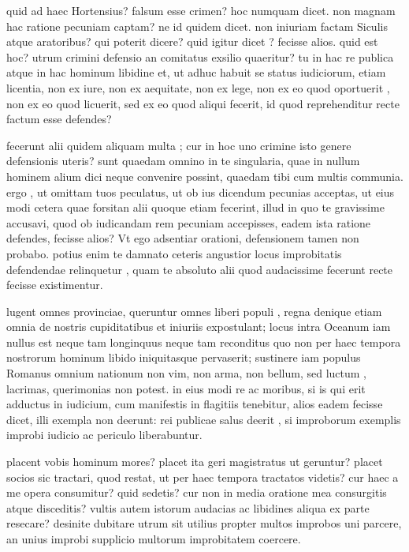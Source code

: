  quid ad haec Hortensius? falsum esse crimen? hoc numquam dicet. non magnam hac ratione pecuniam captam? ne id quidem dicet. non iniuriam factam Siculis atque aratoribus? qui poterit dicere? quid igitur dicet ? fecisse alios. quid est hoc? utrum crimini defensio an comitatus exsilio quaeritur? tu in hac re publica atque in hac hominum libidine et, ut adhuc habuit se status iudiciorum, etiam licentia, non ex iure, non ex aequitate, non ex lege, non ex eo quod oportuerit , non ex eo quod licuerit, sed ex eo quod aliqui fecerit, id quod reprehenditur recte factum esse defendes?

 fecerunt alii quidem aliquam multa ; cur in hoc uno crimine isto genere defensionis uteris? sunt quaedam omnino in te singularia, quae in nullum hominem alium dici neque convenire possint, quaedam tibi cum multis communia. ergo , ut omittam tuos peculatus, ut ob ius dicendum pecunias acceptas, ut eius modi cetera quae forsitan alii quoque etiam fecerint, illud in quo te gravissime accusavi, quod ob iudicandam rem pecuniam accepisses, eadem ista ratione defendes, fecisse alios? Vt ego adsentiar orationi, defensionem tamen non probabo. potius enim te damnato ceteris angustior locus improbitatis defendendae relinquetur , quam te absoluto alii quod audacissime fecerunt recte fecisse existimentur.

 lugent omnes provinciae, queruntur omnes liberi populi , regna denique etiam omnia de nostris cupiditatibus et iniuriis expostulant; locus intra Oceanum iam nullus est neque tam longinquus neque tam reconditus quo non per haec tempora nostrorum hominum libido iniquitasque pervaserit; sustinere iam populus Romanus omnium nationum non vim, non arma, non bellum, sed luctum , lacrimas, querimonias non potest. in eius modi re ac moribus, si is qui erit adductus in iudicium, cum manifestis in flagitiis tenebitur, alios eadem fecisse dicet, illi exempla non deerunt: rei publicae salus deerit , si improborum exemplis improbi iudicio ac periculo liberabuntur.

 placent vobis hominum mores? placet ita geri magistratus ut geruntur? placet socios sic tractari, quod restat, ut per haec tempora tractatos videtis? cur haec a me opera consumitur? quid sedetis? cur non in media oratione mea consurgitis atque disceditis? vultis autem istorum audacias ac libidines aliqua ex parte resecare? desinite dubitare utrum sit utilius propter multos improbos uni parcere, an unius improbi supplicio multorum improbitatem coercere.

